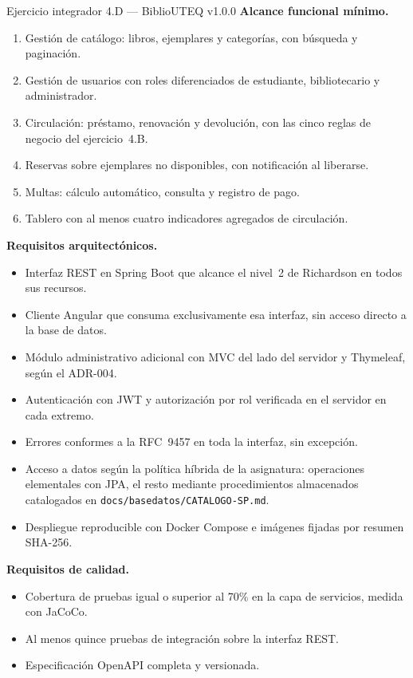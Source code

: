 \documentclass[11pt,a4paper,openany]{book}
\begin{document}
\begin{cajaejercicio}{Ejercicio integrador 4.D --- BiblioUTEQ v1.0.0}
	\textbf{Alcance funcional mínimo.}
	\begin{enumerate}
		\item Gestión de catálogo: libros, ejemplares y categorías, con búsqueda y paginación.
		\item Gestión de usuarios con roles diferenciados de estudiante, bibliotecario y administrador.
		\item Circulación: préstamo, renovación y devolución, con las cinco reglas de negocio del ejercicio~4.B.
		\item Reservas sobre ejemplares no disponibles, con notificación al liberarse.
		\item Multas: cálculo automático, consulta y registro de pago.
		\item Tablero con al menos cuatro indicadores agregados de circulación.
	\end{enumerate}
	\textbf{Requisitos arquitectónicos.}
	\begin{itemize}
		\item Interfaz REST en Spring Boot que alcance el nivel~2 de Richardson en todos sus recursos.
		\item Cliente Angular que consuma exclusivamente esa interfaz, sin acceso directo a la base de datos.
		\item Módulo administrativo adicional con MVC del lado del servidor y Thymeleaf, según el ADR-004.
		\item Autenticación con JWT y autorización por rol verificada en el servidor en cada extremo.
		\item Errores conformes a la RFC~9457 en toda la interfaz, sin excepción.
		\item Acceso a datos según la política híbrida de la asignatura: operaciones elementales con JPA, el resto mediante procedimientos almacenados catalogados en \texttt{docs/basedatos/CATALOGO-SP.md}.
		\item Despliegue reproducible con Docker Compose e imágenes fijadas por resumen SHA-256.
	\end{itemize}
	\textbf{Requisitos de calidad.}
	\begin{itemize}
		\item Cobertura de pruebas igual o superior al 70\% en la capa de servicios, medida con JaCoCo.
		\item Al menos quince pruebas de integración sobre la interfaz REST.
		\item Especificación OpenAPI completa y versionada.

\end{itemize}
\end{cajaejercicio}
\end{document}
